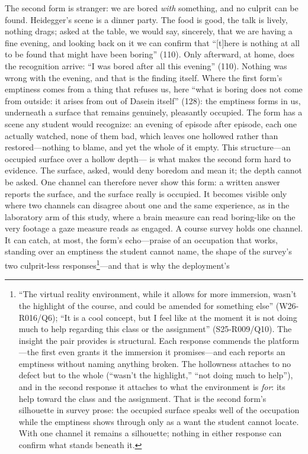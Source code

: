The second form is stranger: we are bored \textit{with} something, and
no culprit can be found. Heidegger's scene is a dinner party. The food
is good, the talk is lively, nothing drags; asked at the table, we
would say, sincerely, that we are having a fine evening, and looking
back on it we can confirm that ``[t]here is nothing at all to be found
that might have been boring'' (110). Only afterward, at home, does the
recognition arrive: ``I was bored after all this evening'' (110).
Nothing was wrong with the evening, and that is the finding itself.
Where the first form's emptiness comes from a thing that refuses us,
here ``what is boring does not come from outside: it arises from out
of Dasein itself'' (128): the emptiness forms in us, underneath a
surface that remains genuinely, pleasantly occupied. The form has a
scene any student would recognize: an evening of episode after
episode, each one actually watched, none of them bad, which leaves one
hollowed rather than restored---nothing to blame, and yet the whole of
it empty. This structure---an occupied surface over a hollow depth---
is what makes the second form hard to evidence. The surface, asked,
would deny boredom and mean it; the depth cannot be asked. One channel
can therefore never show this form: a written answer reports the
surface, and the surface really is occupied. It becomes visible only
where two channels can disagree about one and the same experience, as
%
%
in the laboratory arm of this study, where a brain measure can read
boring-like on the very footage a gaze measure reads as engaged. A
course survey holds one channel. It can catch, at most, the form's
echo---praise of an occupation that works, standing over an emptiness
the student cannot name, the shape of the survey's two culprit-less
responses\footnote{``The virtual reality environment, while it allows
for more immersion, wasn't the highlight of the course, and could be
amended for something else'' (W26-R016/Q6); ``It is a cool concept,
but I feel like at the moment it is not doing much to help regarding
this class or the assignment'' (S25-R009/Q10). The insight the pair
provides is structural. Each response commends the platform---the
first even grants it the immersion it promises---and each reports an
emptiness without naming anything broken. The hollowness attaches to
no defect but to the whole (``wasn't the highlight,'' ``not doing much
to help''), and in the second response it attaches to what the
environment is \textit{for}: its help toward the class and the
assignment. That is the second form's silhouette in survey prose: the
occupied surface speaks well of the occupation while the emptiness
shows through only as a want the student cannot locate. With one
channel it remains a silhouette; nothing in either response can
confirm what stands beneath it.}---and that is why the deployment's

